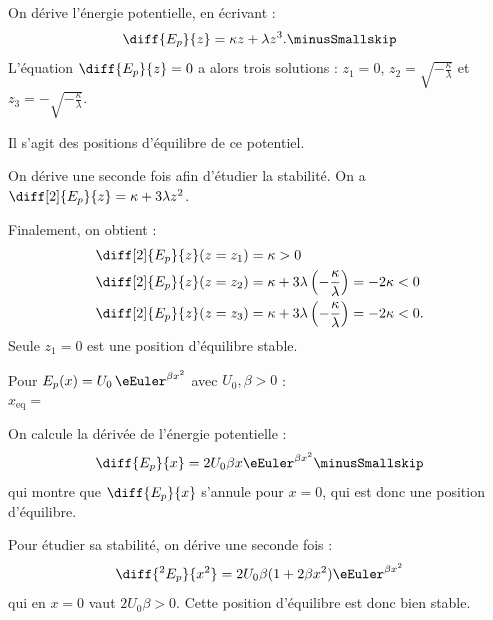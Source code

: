 
\begin{corrige}
On dérive l'énergie potentielle, en écrivant : \minusSmallskip
\[
\diff{E_p}{z} = \kappa z + \lambda z^3.\minusSmallskip
\]
L'équation $\diff{E_p}{z} = 0$ a alors trois solutions : 
$z_1=0$,  
$z_2=\sqrt{-\frac{\kappa}{\lambda}}$
et 
$z_3=-\sqrt{-\frac{\kappa}{\lambda}}$.

Il s'agit des positions d'équilibre de ce potentiel.

On dérive une seconde fois afin d'étudier la stabilité. On a 
$\diff[2]{E_p}{z} = \kappa+3\lambda z^2$.

Finalement, on obtient : \minusMedskip
\begin{align*}
\diff[2]{E_p}{z}(z=z_1)&=\kappa >0 \\
 \diff[2]{E_p}{z}(z=z_2)&=\kappa+3\lambda\left(-\frac{\kappa}{\lambda}\right)=-2\kappa <0 \\
 \diff[2]{E_p}{z}(z=z_3)&=\kappa+3\lambda\left(-\frac{\kappa}{\lambda}\right)=-2\kappa <0.
\end{align*}
Seule $z_1=0$ est une position d'équilibre stable.
\end{corrige}






\begin{enonce}
Pour $E_p(x) = U_0\,\eEuler^{\beta x^2}$ avec  $U_0,\beta >0$ : \minusMedskip \\
$x_{\textrm{eq}} = $
\end{enonce}


\begin{corrige}
On calcule la dérivée de l'énergie potentielle : \minusSmallskip
\[
\diff{E_p}{x} = 2U_0\beta x \eEuler^{\beta x^2} \minusSmallskip
\]
qui montre que $\diff{E_p}{x}$ s'annule pour $x=0$, qui est donc une position d'équilibre. 

Pour étudier sa stabilité, on dérive une seconde fois :
\[
\diff{^2E_p}{x^2}=2U_0\beta(1+2\beta x^2)\eEuler^{\beta x^2}
\]
qui en $x=0$ vaut $2U_0\beta>0$. Cette position d'équilibre est donc bien stable.
\end{corrige}





